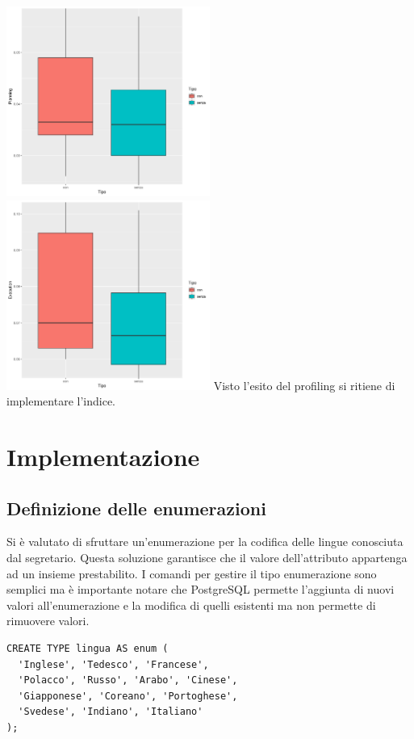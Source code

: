 \documentclass{article}
\begin{document}
\newline
\includegraphics[width=0.5\textwidth]{planning_progetto_budget_modifica.png}
\includegraphics[width=0.5\textwidth]{execution_progetto_budget_modifica.png}
\newline
\newline
Visto l'esito del profiling si ritiene di implementare l'indice.

\newpage

\section{Implementazione}

\subsection{Definizione delle enumerazioni}
Si è valutato di sfruttare un'enumerazione per la codifica delle lingue conosciuta dal segretario.
\newline
Questa soluzione garantisce che il valore dell'attributo appartenga ad un insieme prestabilito.
\newline
\newline
I comandi per gestire il tipo enumerazione sono semplici ma è importante notare che PostgreSQL permette l'aggiunta di nuovi valori all'enumerazione e la modifica di quelli esistenti ma non permette di rimuovere valori.
\begin{verbatim}
CREATE TYPE lingua AS enum (
  'Inglese', 'Tedesco', 'Francese', 
  'Polacco', 'Russo', 'Arabo', 'Cinese', 
  'Giapponese', 'Coreano', 'Portoghese', 
  'Svedese', 'Indiano', 'Italiano'
);
\end{verbatim}
\end{document}
